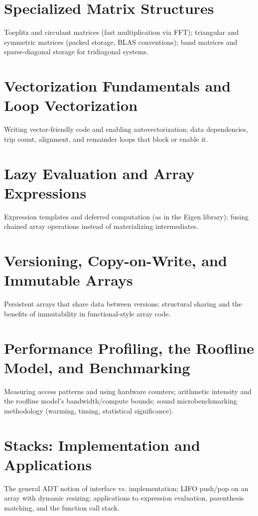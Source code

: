 \chapter{Specialized Matrix Structures}
Toeplitz and circulant matrices (fast multiplication via FFT); triangular and symmetric matrices (packed storage, BLAS conventions); band matrices and sparse-diagonal storage for tridiagonal systems.

\chapter{Vectorization Fundamentals and Loop Vectorization}
Writing vector-friendly code and enabling autovectorization; data dependencies, trip count, alignment, and remainder loops that block or enable it.

\chapter{Lazy Evaluation and Array Expressions}
Expression templates and deferred computation (as in the Eigen library); fusing chained array operations instead of materializing intermediates.

\chapter{Versioning, Copy-on-Write, and Immutable Arrays}
Persistent arrays that share data between versions; structural sharing and the benefits of immutability in functional-style array code.

\chapter{Performance Profiling, the Roofline Model, and Benchmarking}
Measuring access patterns and using hardware counters; arithmetic intensity and the roofline model's bandwidth/compute bounds; sound microbenchmarking methodology (warming, timing, statistical significance).


\chapter{Stacks: Implementation and Applications}
The general ADT notion of interface vs. implementation; LIFO push/pop on an array with dynamic resizing; applications to expression evaluation, parenthesis matching, and the function call stack.


